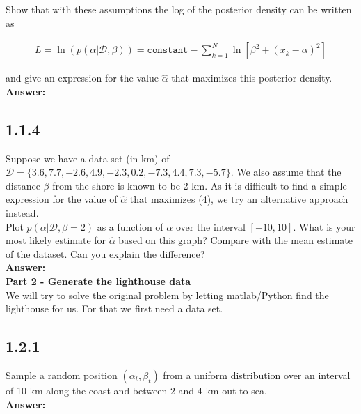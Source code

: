 \documentclass[a4paper]{article}
\begin{document}
Show that with these assumptions the log of the posterior density can be written as

\begin{eqnarray}
L = \ln (p(\alpha | \mathcal{D, \beta})) = \texttt{constant} - \sum_{k = 1}^N \ln [\beta^2 + (x_k - \alpha)^2] 
\end{eqnarray}

and give an expression for the value $\hat{\alpha}$ that maximizes this posterior density.\\

\textbf{Answer:}\\


\subsection*{1.1.4}

Suppose we have a data set (in km) of $\mathcal{D} = \{ 3.6, 7.7, -2.6, 4.9, -2.3, 0.2, -7.3, 4.4, 7.3, -5.7\}$. We also assume that the distance $\beta$ from the shore is known to be 2 km. As it is difficult to find a simple expression for the value of $\hat{\alpha}$ that maximizes (4), we try an alternative approach instead.\\

Plot $p(\alpha|\mathcal{D}, \beta = 2)$ as a function of $\alpha$ over the interval $[-10, 10]$. What is your most likely estimate for $\hat{\alpha}$ based on this graph? Compare with the mean estimate of the dataset. Can you explain the difference?\\


\textbf{Answer:}\\




\textbf{Part 2 - Generate the lighthouse data}\\


We will try to solve the original problem by letting matlab/Python find the lighthouse for us. For that we first need a data set.

\subsection*{1.2.1}

Sample a random position $(\alpha_t, \beta_t)$ from a uniform distribution over an interval of 10 km along the coast and between 2 and 4 km out to sea.\\

\textbf{Answer:}\\
\end{document}
